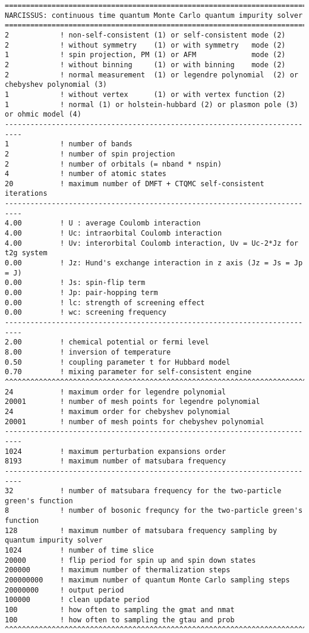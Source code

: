 \begin{lstlisting}[frame=single]
==========================================================================
NARCISSUS: continuous time quantum Monte Carlo quantum impurity solver
==========================================================================
2            ! non-self-consistent (1) or self-consistent mode (2)
2            ! without symmetry    (1) or with symmetry   mode (2)
1            ! spin projection, PM (1) or AFM             mode (2)
2            ! without binning     (1) or with binning    mode (2)
2            ! normal measurement  (1) or legendre polynomial  (2) or chebyshev polynomial (3)
1            ! without vertex      (1) or with vertex function (2)
1            ! normal (1) or holstein-hubbard (2) or plasmon pole (3) or ohmic model (4)
--------------------------------------------------------------------------
1            ! number of bands
2            ! number of spin projection
2            ! number of orbitals (= nband * nspin)
4            ! number of atomic states
20           ! maximum number of DMFT + CTQMC self-consistent iterations
--------------------------------------------------------------------------
4.00         ! U : average Coulomb interaction
4.00         ! Uc: intraorbital Coulomb interaction
4.00         ! Uv: interorbital Coulomb interaction, Uv = Uc-2*Jz for t2g system
0.00         ! Jz: Hund's exchange interaction in z axis (Jz = Js = Jp = J)
0.00         ! Js: spin-flip term
0.00         ! Jp: pair-hopping term
0.00         ! lc: strength of screening effect
0.00         ! wc: screening frequency
--------------------------------------------------------------------------
2.00         ! chemical potential or fermi level
8.00         ! inversion of temperature
0.50         ! coupling parameter t for Hubbard model
0.70         ! mixing parameter for self-consistent engine
^^^^^^^^^^^^^^^^^^^^^^^^^^^^^^^^^^^^^^^^^^^^^^^^^^^^^^^^^^^^^^^^^^^^^^^^^^
24           ! maximum order for legendre polynomial
20001        ! number of mesh points for legendre polynomial
24           ! maximum order for chebyshev polynomial
20001        ! number of mesh points for chebyshev polynomial
--------------------------------------------------------------------------
1024         ! maximum perturbation expansions order
8193         ! maximum number of matsubara frequency
--------------------------------------------------------------------------
32           ! number of matsubara frequency for the two-particle green's function
8            ! number of bosonic frequncy for the two-particle green's function
128          ! maximum number of matsubara frequency sampling by quantum impurity solver
1024         ! number of time slice
20000        ! flip period for spin up and spin down states
200000       ! maximum number of thermalization steps
200000000    ! maximum number of quantum Monte Carlo sampling steps
20000000     ! output period
100000       ! clean update period
100          ! how often to sampling the gmat and nmat
100          ! how often to sampling the gtau and prob
^^^^^^^^^^^^^^^^^^^^^^^^^^^^^^^^^^^^^^^^^^^^^^^^^^^^^^^^^^^^^^^^^^^^^^^^^^
\end{lstlisting}


